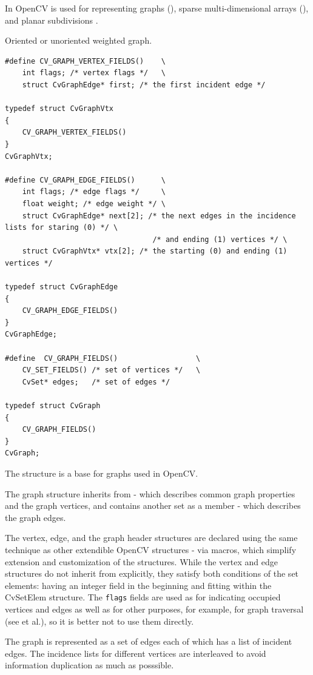 In OpenCV  is used for representing graphs (),
sparse multi-dimensional arrays (), and planar subdivisions
.


\label{CvGraph}
Oriented or unoriented weighted graph.

\begin{lstlisting}
#define CV_GRAPH_VERTEX_FIELDS()    \
    int flags; /* vertex flags */   \
    struct CvGraphEdge* first; /* the first incident edge */

typedef struct CvGraphVtx
{
    CV_GRAPH_VERTEX_FIELDS()
}
CvGraphVtx;

#define CV_GRAPH_EDGE_FIELDS()      \
    int flags; /* edge flags */     \
    float weight; /* edge weight */ \
    struct CvGraphEdge* next[2]; /* the next edges in the incidence lists for staring (0) */ \
                                  /* and ending (1) vertices */ \
    struct CvGraphVtx* vtx[2]; /* the starting (0) and ending (1) vertices */

typedef struct CvGraphEdge
{
    CV_GRAPH_EDGE_FIELDS()
}
CvGraphEdge;

#define  CV_GRAPH_FIELDS()                  \
    CV_SET_FIELDS() /* set of vertices */   \
    CvSet* edges;   /* set of edges */

typedef struct CvGraph
{
    CV_GRAPH_FIELDS()
}
CvGraph;

\end{lstlisting}

The structure  is a base for graphs used in OpenCV.

The graph structure inherits from  - which describes common graph properties and the graph vertices, and contains another set as a member - which describes the graph edges.

The vertex, edge, and the graph header structures are declared using the
same technique as other extendible OpenCV structures - via macros, which
simplify extension and customization of the structures. While the vertex
and edge structures do not inherit from  explicitly, they
satisfy both conditions of the set elements: having an integer field in
the beginning and fitting within the CvSetElem structure. The \texttt{flags} fields are
used as for indicating occupied vertices and edges as well as for other
purposes, for example, for graph traversal (see \cvCPyCross{CreateGraphScanner}
et al.), so it is better not to use them directly.

The graph is represented as a set of edges each of which has a list of
incident edges. The incidence lists for different vertices are interleaved
to avoid information duplication as much as posssible.

